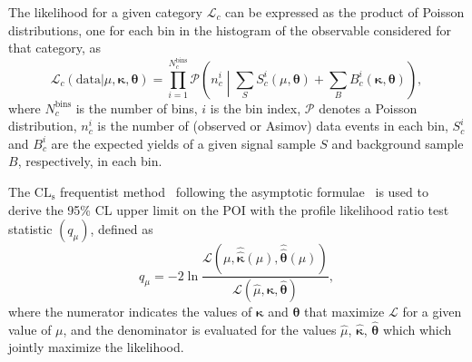 The likelihood for a given category $\mathcal{L}_c$ can be expressed as the product of Poisson distributions, one for each bin in the histogram of the observable considered for that category, as
\begin{equation}
    \mathcal{L}_c\left(\mathrm{data}\vert\mu,\bm{\kappa},\bm{\theta}\right) = \prod_{i=1}^{N_c^\mathrm{bins}}\mathcal{P}\left(n^i_c\middle\vert\sum_{S} S^i_{c}(\mu,\bm{\theta}) + \sum_{B}B^i_{c}(\bm{\kappa},\bm{\theta}) \right),
    \label{eq:cat_likelihood}
\end{equation}
where $N^\mathrm{bins}_c$ is the number of bins, $i$ is the bin index, $\mathcal{P}$ denotes a Poisson distribution, $n^i_c$ is the number of (observed or Asimov) data events in each bin, $S^i_{c}$ and $B^i_{c}$ are the expected yields of a given signal sample $S$ and background sample $B$, respectively, in each bin.

The $\mathrm{CL_s}$ frequentist method~\cite{Read:2002hq} following the asymptotic formulae~\cite{Cowan:2010js} is used to derive the 95\% CL upper limit on the POI with the profile likelihood ratio test statistic $(q_\mu)$, defined as
\begin{equation}
    q_\mu = -2\ln\frac{\mathcal{L}\left(\mu,\hat{\hat{\bm{\kappa}}}(\mu), \hat{\hat{\bm{\theta}}}(\mu)\right)}{\mathcal{L}\left(\hat{\mu},{\hat{\bm{\kappa}}}, {\hat{\bm{\theta}}}\right)},
    \label{eq:qmu}
\end{equation}
where the numerator indicates the values of $\bm{\kappa}$ and $\bm{\theta}$ that maximize $\mathcal{L}$ for a given value of $\mu$, and the denominator is evaluated for the values $\hat{\mu}$, ${\hat{\bm{\kappa}}}$, ${\hat{\bm{\theta}}}$ which which jointly maximize the likelihood.


